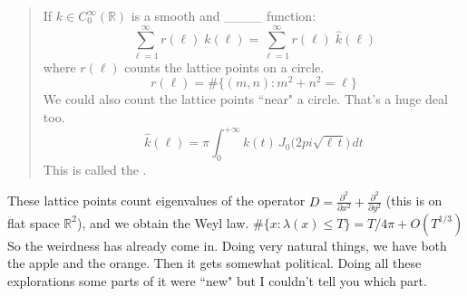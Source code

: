 \documentclass[12pt]{article}
\begin{document}
\begin{quotation} If $k \in C_0^\infty(\mathbb{R})$ is a smooth and \_\_\_\_ function:
$$ \sum_{\ell=1}^\infty r(\ell) \; k(\ell) = \sum_{\ell=1}^\infty r(\ell) \; \widehat{k}(\ell)$$
where $r(\ell)$ counts the lattice points on a circle.  
$$ r(\ell) = \# \Big\{ (m,n): m^2 + n^2 = \ell  \Big\}  $$
We could also count the lattice points ``near" a circle.  That's a huge deal too.
$$ \widehat{k} (\ell) = \pi \int_0^{+\infty} k(t) \, J_0 \big( 2pi \sqrt{\ell \, t} \big) \, dt$$
This is called the {\color{red!50!orange}{Hankel transform}}.
\end{quotation}
These lattice points count eigenvalues of the operator $D = \frac{\partial^2 }{\partial x^2} + \frac{\partial^2 }{\partial y^2} $ (this is on flat space $\mathbb{R}^2$), and we obtain the Weyl law.  $\# \{ x : \lambda (x ) \leq T \}  = T/4\pi + O(T^{1/3}) $
\vfill
So the weirdness has already come in.  Doing very natural things, we have both the apple and the orange.  Then it gets somewhat political.  Doing all these explorations some parts of it were ``new" but I couldn't tell you which part. 
\end{document}
